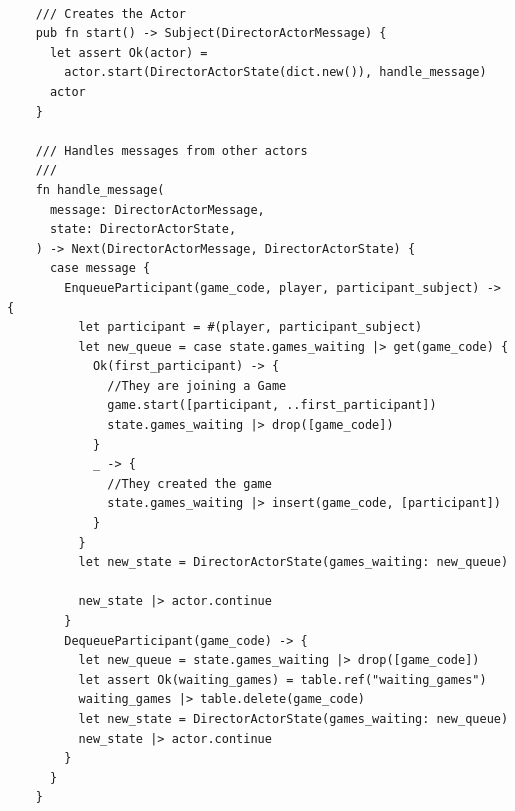 \documentclass[]{final}
\begin{document}
\begin{minipage}[t]{20em}
  \begin{lstlisting}

    /// Creates the Actor
    pub fn start() -> Subject(DirectorActorMessage) {
      let assert Ok(actor) =
        actor.start(DirectorActorState(dict.new()), handle_message)
      actor
    }

    /// Handles messages from other actors
    ///
    fn handle_message(
      message: DirectorActorMessage,
      state: DirectorActorState,
    ) -> Next(DirectorActorMessage, DirectorActorState) {
      case message {
        EnqueueParticipant(game_code, player, participant_subject) -> {
          let participant = #(player, participant_subject)
          let new_queue = case state.games_waiting |> get(game_code) {
            Ok(first_participant) -> {
              //They are joining a Game
              game.start([participant, ..first_participant])
              state.games_waiting |> drop([game_code])
            }
            _ -> {
              //They created the game
              state.games_waiting |> insert(game_code, [participant])
            }
          }
          let new_state = DirectorActorState(games_waiting: new_queue)

          new_state |> actor.continue
        }
        DequeueParticipant(game_code) -> {
          let new_queue = state.games_waiting |> drop([game_code])
          let assert Ok(waiting_games) = table.ref("waiting_games")
          waiting_games |> table.delete(game_code)
          let new_state = DirectorActorState(games_waiting: new_queue)
          new_state |> actor.continue
        }
      }
    }

      \end{lstlisting}
  \label{fig: 6}
\end{minipage}

\newpage
\end{document}
